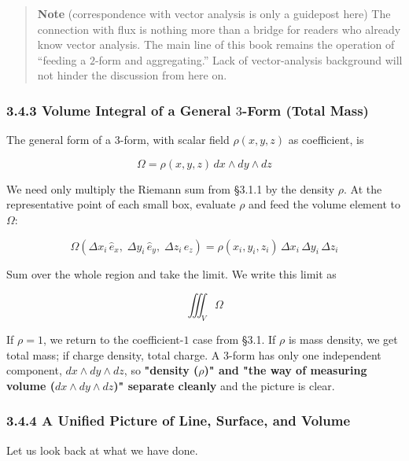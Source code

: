 \begin{quote}
\textbf{Note} (correspondence with vector analysis is only a guidepost
here) The connection with flux is nothing more than a bridge for readers
who already know vector analysis. The main line of this book remains the
operation of ``feeding a \(2\)-form and aggregating.'' Lack of
vector-analysis background will not hinder the discussion from here on.
\end{quote}

\hypertarget{volume-integral-of-a-general-3-form-total-mass}{%
\subsubsection{\texorpdfstring{3.4.3 Volume Integral of a General
\(3\)-Form (Total
Mass)}{3.4.3 Volume Integral of a General 3-Form (Total Mass)}}\label{volume-integral-of-a-general-3-form-total-mass}}

The general form of a \(3\)-form, with scalar field \(\rho(x,y,z)\) as
coefficient, is

\[\Omega = \rho(x,y,z)\,dx \wedge dy \wedge dz\]

We need only multiply the Riemann sum from §3.1.1 by the density
\(\rho\). At the representative point of each small box, evaluate
\(\rho\) and feed the volume element to \(\Omega\):

\[\Omega(\Delta x_i\,\hat{e}_x,\; \Delta y_i\,\hat{e}_y,\; \Delta z_i\,\hat{e}_z) = \rho(x_i,y_i,z_i)\,\Delta x_i\,\Delta y_i\,\Delta z_i\]

Sum over the whole region and take the limit. We write this limit as

\[\iiint_V \Omega\]

If \(\rho=1\), we return to the coefficient-\(1\) case from §3.1. If
\(\rho\) is mass density, we get total mass; if charge density, total
charge. A \(3\)-form has only one independent component,
\(dx \wedge dy \wedge dz\), so
\textbf{"density ($\rho$)" and "the way of measuring volume ($dx \wedge dy \wedge dz$)" separate cleanly}
and the picture is clear.

\hypertarget{a-unified-picture-of-line-surface-and-volume}{%
\subsubsection{3.4.4 A Unified Picture of Line, Surface, and
Volume}\label{a-unified-picture-of-line-surface-and-volume}}

Let us look back at what we have done.

